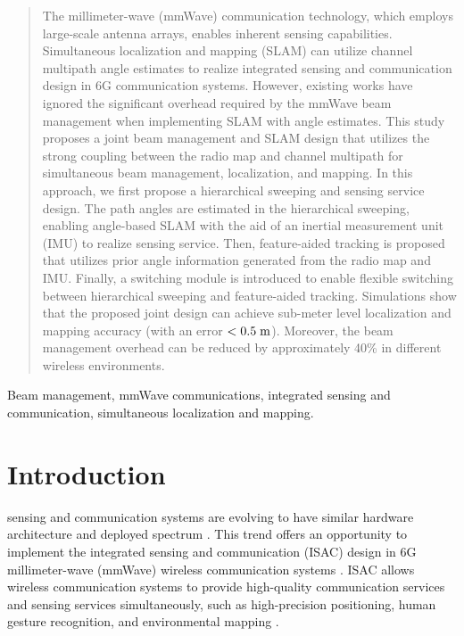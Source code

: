\documentclass[journal,12pt,onecolumn,draftclsnofoot,]{IEEEtran}
\begin{document}
\maketitle
\begin{abstract}
The millimeter-wave (mmWave) communication technology, which employs large-scale antenna arrays, enables inherent sensing capabilities. 
Simultaneous localization and mapping (SLAM) can utilize channel multipath angle estimates to realize integrated sensing and communication design in 6G communication systems. 
However, existing works have ignored the significant overhead required by the mmWave beam management when implementing SLAM with angle estimates. 
This study proposes a joint beam management and SLAM design that utilizes the strong coupling between the radio map and channel multipath for simultaneous beam management, localization, and mapping. 
In this approach, we first propose a hierarchical sweeping and sensing service design. The path angles are estimated in the hierarchical sweeping, enabling angle-based SLAM with the aid of an inertial measurement unit (IMU) to realize sensing service. 
Then, feature-aided tracking is proposed that utilizes prior angle information generated from the radio map and IMU. 
Finally, a switching module is introduced to enable flexible switching between hierarchical sweeping and feature-aided tracking. 
Simulations show that the proposed joint design can achieve sub-meter level localization and mapping accuracy (with an error $<0.5 \;{\rm m}$). Moreover, the beam management overhead can be reduced by approximately 40\% in different wireless environments. 
\end{abstract}

\begin{IEEEkeywords}
Beam management, mmWave communications, integrated sensing and communication, simultaneous localization and mapping.
\end{IEEEkeywords}


\IEEEpeerreviewmaketitle


\section{Introduction}
 sensing and communication systems are evolving to have similar hardware architecture and deployed spectrum \cite{a0}. 
This trend offers an opportunity to implement the integrated sensing and communication (ISAC) design in 6G millimeter-wave (mmWave) wireless communication systems \cite{a001}. 
ISAC allows wireless communication systems to provide high-quality communication services and sensing services simultaneously, such as high-precision positioning, human gesture recognition, and environmental mapping \cite{a1}.
\end{document}

